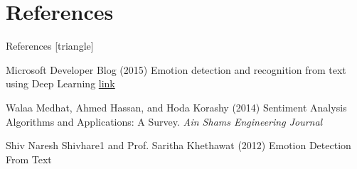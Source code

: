 \documentclass[xcolor=dvipsnames]{beamer}
\begin{document}
\section{References}
\begin{frame}{References}
[triangle]
 \begin{thebibliography}{99} %
 Microsoft Developer Blog (2015)
\newblock Emotion detection and recognition from text using Deep Learning
\newblock \href{https://www.microsoft.com/developerblog/2015/11/29/emotion-detection-and-recognition-from-text-using-deep-learning/}{link}

 Walaa Medhat, Ahmed Hassan, and Hoda Korashy (2014)
\newblock Sentiment Analysis Algorithms and Applications: A Survey.
\newblock \emph{Ain Shams Engineering Journal}

 Shiv Naresh Shivhare1 and Prof. Saritha Khethawat (2012)
\newblock Emotion Detection From Text

\end{thebibliography}

\end{frame}
\end{document}
